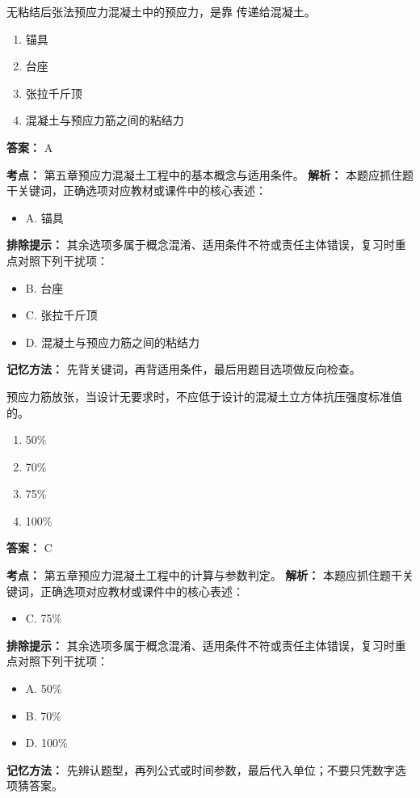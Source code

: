 \documentclass[UTF8,fontset=fandol,11pt]{ctexart}
\begin{document}
\begin{quizbox}[title={第 1 题}]
无粘结后张法预应力混凝土中的预应力，是靠 传递给混凝土。\\
\begin{enumerate}[label=\Alph*.]
\item 锚具
\item 台座
\item 张拉千斤顶
\item 混凝土与预应力筋之间的粘结力
\end{enumerate}
\textbf{答案：} A
\vspace{0.25em}
\begin{answerbox}[title={考点解析}]
\textbf{考点：} 第五章预应力混凝土工程中的基本概念与适用条件。
\textbf{解析：} 本题应抓住题干关键词，正确选项对应教材或课件中的核心表述：
\begin{itemize}
\item A. 锚具
\end{itemize}
\textbf{排除提示：} 其余选项多属于概念混淆、适用条件不符或责任主体错误，复习时重点对照下列干扰项：
\begin{itemize}
\item B. 台座
\item C. 张拉千斤顶
\item D. 混凝土与预应力筋之间的粘结力
\end{itemize}
\textbf{记忆方法：} 先背关键词，再背适用条件，最后用题目选项做反向检查。
\end{answerbox}
\end{quizbox}

\begin{quizbox}[title={第 2 题}]
预应力筋放张，当设计无要求时，不应低于设计的混凝土立方体抗压强度标准值的。\\
\begin{enumerate}[label=\Alph*.]
\item 50\%
\item 70\%
\item 75\%
\item 100\%
\end{enumerate}
\textbf{答案：} C
\vspace{0.25em}
\begin{answerbox}[title={考点解析}]
\textbf{考点：} 第五章预应力混凝土工程中的计算与参数判定。
\textbf{解析：} 本题应抓住题干关键词，正确选项对应教材或课件中的核心表述：
\begin{itemize}
\item C. 75\%
\end{itemize}
\textbf{排除提示：} 其余选项多属于概念混淆、适用条件不符或责任主体错误，复习时重点对照下列干扰项：
\begin{itemize}
\item A. 50\%
\item B. 70\%
\item D. 100\%
\end{itemize}
\textbf{记忆方法：} 先辨认题型，再列公式或时间参数，最后代入单位；不要只凭数字选项猜答案。
\end{answerbox}
\end{quizbox}
\end{document}
